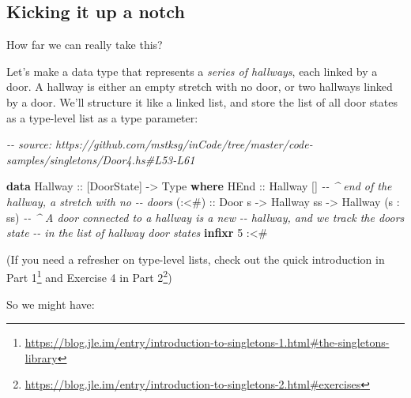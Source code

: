 \documentclass[]{article}
\newenvironment{Shaded}{}{}
\newcommand{\CommentTok}[1]{\textcolor[rgb]{0.38,0.63,0.69}{\textit{#1}}}
\newcommand{\DataTypeTok}[1]{\textcolor[rgb]{0.56,0.13,0.00}{#1}}
\newcommand{\DecValTok}[1]{\textcolor[rgb]{0.25,0.63,0.44}{#1}}
\newcommand{\KeywordTok}[1]{\textcolor[rgb]{0.00,0.44,0.13}{\textbf{#1}}}
\newcommand{\NormalTok}[1]{#1}
\newcommand{\OperatorTok}[1]{\textcolor[rgb]{0.40,0.40,0.40}{#1}}
\newcommand{\OtherTok}[1]{\textcolor[rgb]{0.00,0.44,0.13}{#1}}
\renewcommand{\href}[2]{#2\footnote{\url{#1}}}
\begin{document}
\subsection{Kicking it up a notch}\label{kicking-it-up-a-notch}

How far we can really take this?

Let's make a data type that represents a \emph{series of hallways}, each linked
by a door. A hallway is either an empty stretch with no door, or two hallways
linked by a door. We'll structure it like a linked list, and store the list of
all door states as a type-level list as a type parameter:

\begin{Shaded}
\begin{Highlighting}[]
\CommentTok{{-}{-} source: https://github.com/mstksg/inCode/tree/master/code{-}samples/singletons/Door4.hs\#L53{-}L61}

\KeywordTok{data} \DataTypeTok{Hallway}\OtherTok{ ::}\NormalTok{ [}\DataTypeTok{DoorState}\NormalTok{] }\OtherTok{{-}\textgreater{}} \DataTypeTok{Type} \KeywordTok{where}
    \DataTypeTok{HEnd}\OtherTok{  ::} \DataTypeTok{Hallway}\NormalTok{ \textquotesingle{}[]        }\CommentTok{{-}{-} \^{} end of the hallway, a stretch with no}
                                \CommentTok{{-}{-}   doors}
\OtherTok{    (:\textless{}\#) ::} \DataTypeTok{Door}\NormalTok{ s}
          \OtherTok{{-}\textgreater{}} \DataTypeTok{Hallway}\NormalTok{ ss}
          \OtherTok{{-}\textgreater{}} \DataTypeTok{Hallway}\NormalTok{ (s \textquotesingle{}}\OperatorTok{:}\NormalTok{ ss)  }\CommentTok{{-}{-} \^{} A door connected to a hallway is a new}
                                \CommentTok{{-}{-}   hallway, and we track the door\textquotesingle{}s state}
                                \CommentTok{{-}{-}   in the list of hallway door states}
\KeywordTok{infixr} \DecValTok{5} \OperatorTok{:\textless{}\#}
\end{Highlighting}
\end{Shaded}

(If you need a refresher on type-level lists, check out
\href{https://blog.jle.im/entry/introduction-to-singletons-1.html\#the-singletons-library}{the
quick introduction in Part 1} and
\href{https://blog.jle.im/entry/introduction-to-singletons-2.html\#exercises}{Exercise
4 in Part 2})

So we might have:
\end{document}
